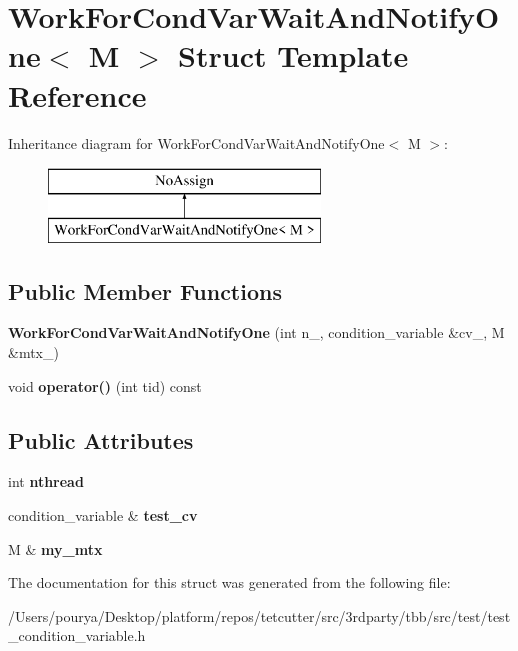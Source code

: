 \hypertarget{structWorkForCondVarWaitAndNotifyOne}{}\section{Work\+For\+Cond\+Var\+Wait\+And\+Notify\+One$<$ M $>$ Struct Template Reference}
\label{structWorkForCondVarWaitAndNotifyOne}
Inheritance diagram for Work\+For\+Cond\+Var\+Wait\+And\+Notify\+One$<$ M $>$\+:\begin{figure}[H]
\begin{center}
\leavevmode
\includegraphics[height=2.000000cm]{structWorkForCondVarWaitAndNotifyOne}
\end{center}
\end{figure}
\subsection*{Public Member Functions}
\begin{DoxyCompactItemize}
\item 
\hypertarget{structWorkForCondVarWaitAndNotifyOne_a0d67958998cf46e08fa7f5e16f8f62d8}{}{\bfseries Work\+For\+Cond\+Var\+Wait\+And\+Notify\+One} (int n\+\_\+, condition\+\_\+variable \&cv\+\_\+, M \&mtx\+\_\+)\label{structWorkForCondVarWaitAndNotifyOne_a0d67958998cf46e08fa7f5e16f8f62d8}

\item 
\hypertarget{structWorkForCondVarWaitAndNotifyOne_aac014556dbb13fc07c394466996e607f}{}void {\bfseries operator()} (int tid) const \label{structWorkForCondVarWaitAndNotifyOne_aac014556dbb13fc07c394466996e607f}

\end{DoxyCompactItemize}
\subsection*{Public Attributes}
\begin{DoxyCompactItemize}
\item 
\hypertarget{structWorkForCondVarWaitAndNotifyOne_a92b977490707eac3bad00c66a7d6e2a6}{}int {\bfseries nthread}\label{structWorkForCondVarWaitAndNotifyOne_a92b977490707eac3bad00c66a7d6e2a6}

\item 
\hypertarget{structWorkForCondVarWaitAndNotifyOne_a0343c2c16b99aff32f5d146d7bdef227}{}condition\+\_\+variable \& {\bfseries test\+\_\+cv}\label{structWorkForCondVarWaitAndNotifyOne_a0343c2c16b99aff32f5d146d7bdef227}

\item 
\hypertarget{structWorkForCondVarWaitAndNotifyOne_a3505d3592a87d23f0e4e65f00bc5cfe8}{}M \& {\bfseries my\+\_\+mtx}\label{structWorkForCondVarWaitAndNotifyOne_a3505d3592a87d23f0e4e65f00bc5cfe8}

\end{DoxyCompactItemize}


The documentation for this struct was generated from the following file\+:\begin{DoxyCompactItemize}
\item 
/\+Users/pourya/\+Desktop/platform/repos/tetcutter/src/3rdparty/tbb/src/test/test\+\_\+condition\+\_\+variable.\+h\end{DoxyCompactItemize}
